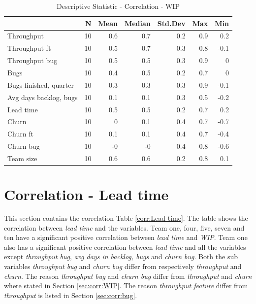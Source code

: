 \documentclass[UKenglish]{ifimaster}  %
\begin{document}
\begin{table}[!htbp]
 \centering
 \begin{tabular}{ | l | r | r | r | r | r | r | }
 \hline
& \bf{N} & \bf{Mean} & \bf{Median} & \bf{Std.Dev} & \bf{Max} & \bf{Min} \\ \hline
Throughput  & 10 & 0.6 & 0.7 & 0.2 & 0.9 & 0.2\\ \hline
Throughput ft  & 10 & 0.5 & 0.7 & 0.3 & 0.8 & -0.1\\ \hline
Throughput bug  & 10 & 0.5 & 0.5 & 0.3 & 0.9 & 0\\ \hline
Bugs  & 10 & 0.4 & 0.5 & 0.2 & 0.7 & 0\\ \hline
Bugs finished, quarter  & 10 & 0.3 & 0.3 & 0.3 & 0.9 & -0.1\\ \hline
Avg days backlog, bugs  & 10 & 0.1 & 0.1 & 0.3 & 0.5 & -0.2\\ \hline
Lead time & 10 & 0.5 & 0.5 & 0.2 & 0.7 & 0.2\\ \hline
Churn  & 10 & 0 & 0.1 & 0.4 & 0.7 & -0.7\\ \hline
Churn ft  & 10 & 0.1 & 0.1 & 0.4 & 0.7 & -0.4\\ \hline
Churn bug  & 10 & -0 & -0 & 0.4 & 0.8 & -0.6\\ \hline
Team size  & 10 & 0.6 & 0.6 & 0.2 & 0.8 & 0.1\\ \hline
\end{tabular}
 \caption{Descriptive Statistic - Correlation - WIP}
 \label{DS:corr:WIP}
 \end{table}




\section{Correlation - Lead time}
\label{sec:corr:lt}
This section contains the correlation Table \ref{corr:Lead time}. The table shows the correlation between \textit{lead time} and the variables. Team one, four, five, seven and ten have a significant positive correlation between \textit{lead time} and \textit{WIP}. Team one also has a significant positive correlation between \textit{lead time} and all the variables except \textit{throughput bug}, \textit{avg days in backlog, bugs} and \textit{churn bug}. Both the sub variables \textit{throughput bug} and \textit{churn bug} differ from respectively \textit{throughput} and \textit{churn}. The reason \textit{throughput bug} and \textit{churn bug} differ from \textit{throughput} and \textit{churn} where stated in Section \ref{sec:corr:WIP}.  The reason \textit{throughput feature} differ from \textit{throughput} is listed in Section \ref{sec:corr:bug}.
\end{document}

